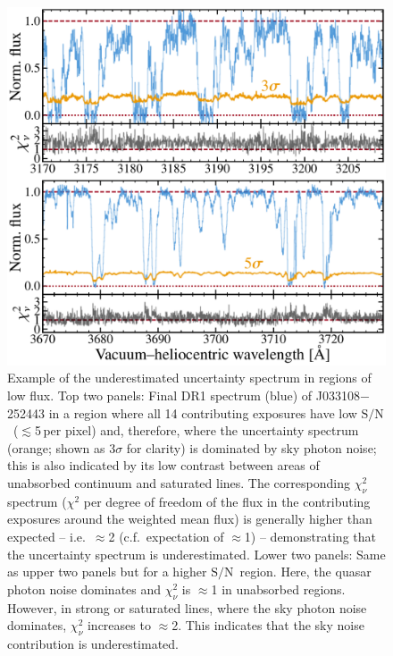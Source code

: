 \documentclass[fleqn,usenatbib,usedcolumn]{mnras}
\renewcommand{\la}{\lesssim} %
\newcommand{\SN}{\ensuremath{\textrm{S/N}}}
\begin{document}
\begin{figure}
\begin{center}
\includegraphics[width=0.95\columnwidth]{DR1_unc_underestimate.pdf}
\vspace{-1em}
\caption{Example of the underestimated uncertainty spectrum in regions of low flux. Top two panels: Final DR1 spectrum (blue) of J033108$-$252443 in a region where all 14 contributing exposures have low \SN\ ($\la$5\,per pixel) and, therefore, where the uncertainty spectrum (orange; shown as 3$\sigma$ for clarity) is dominated by sky photon noise; this is also indicated by its low contrast between areas of unabsorbed continuum and saturated lines. The corresponding $\chi^2_\nu$ spectrum ($\chi^2$ per degree of freedom of the flux in the contributing exposures around the weighted mean flux) is generally higher than expected -- i.e.\ $\approx$2 (c.f.\ expectation of $\approx$1) -- demonstrating that the uncertainty spectrum is underestimated. Lower two panels: Same as upper two panels but for a higher \SN\ region. Here, the quasar photon noise dominates and $\chi^2_\nu$ is $\approx$1 in unabsorbed regions. However, in strong or saturated lines, where the sky photon noise dominates, $\chi^2_\nu$ increases to $\approx$2. This indicates that the sky noise contribution is underestimated.}
\label{f:unc_underestimate}
\end{center}
\end{figure}
\end{document}
